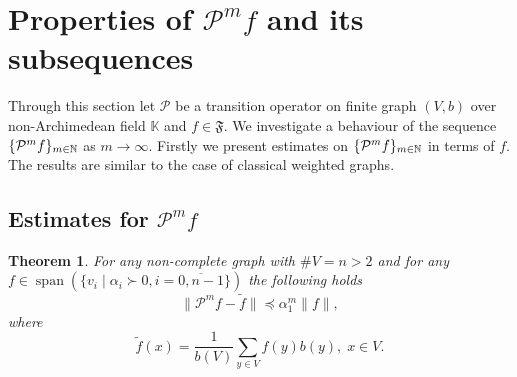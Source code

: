\documentclass[a4paper,12pt]{amsart}
\newtheorem{theorem}{Theorem}
\theoremstyle{definition}
\DeclareMathOperator\lspan{span}
\renewcommand{\P}{\mathcal{P}}
\newcommand{\K}{\mathbb{K}}
\newcommand{\weight}{b}
\begin{document}
\section{Properties of $\P^m f$ and its subsequences}
Through this section let $\P$ be a transition operator on finite graph $(V,b)$ over non-Archimedean field $\K$ and $f\in \mathfrak F$. We investigate a behaviour of the sequence $\{\P^m f\}_{m\in \Bbb N}$ as $m\to \infty$. Firstly we present estimates on $\{\P^m f\}_{m\in \Bbb N}$ in terms of $f$. The results are similar to the case of classical weighted graphs. 
\subsection{Estimates for $\P^m f$}
\label{section::rw}
\begin{theorem}\label{Thm4}
For any non-complete graph with $\#V=n>2$ and for any $f\in \lspan(\{v_i \mid \alpha_i\succ 0, i=\overline{0,n-1}\})$ the following holds
 \begin{equation*}
\|\P^{m} f - \widetilde f\|\preceq \alpha_1^m \|f\|,
\end{equation*}
where
\begin{equation*}
\widetilde f(x)=\dfrac{1}{\weight (V)}\sum_{y\in V} f(y)\weight (y),\; x\in V.
\end{equation*}
\end{theorem}
\end{document}
